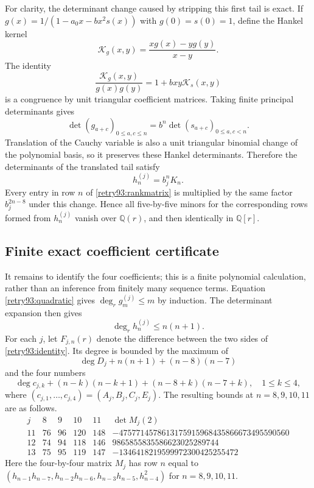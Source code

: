 \documentclass[11pt,a4paper]{article}
\theoremstyle{definition}
\theoremstyle{remark}
\begin{document}
For clarity, the determinant change caused by stripping this first tail
is exact. If $g(x)=1/(1-a_0x-bx^2s(x))$ with $g(0)=s(0)=1$, define the
Hankel kernel
\[
 \mathcal K_g(x,y)=\frac{xg(x)-yg(y)}{x-y}.
\]
The identity
\[
 \frac{\mathcal K_g(x,y)}{g(x)g(y)}=1+bxy\mathcal K_s(x,y)
\]
is a congruence by unit triangular coefficient matrices. Taking finite
principal determinants gives
\[
 \det(g_{a+c})_{0\le a,c\le n}
 =b^n\det(s_{a+c})_{0\le a,c<n}.
\]
Translation of the Cauchy variable is also a unit triangular binomial
change of the polynomial basis, so it preserves these Hankel determinants.
Therefore the determinants of the translated tail satisfy
\begin{equation}\label{retry93:gauge}
 h_n^{(j)}=b_j^nK_n.
\end{equation}
Every entry in row $n$ of \eqref{retry93:rankmatrix} is multiplied by the
same factor $b_j^{2n-8}$ under this change. Hence all five-by-five minors
for the corresponding rows formed from $h_n^{(j)}$ vanish over
$\mathbb Q(r)$, and then identically in $\mathbb Q[r]$.

\subsection{Finite exact coefficient certificate}
It remains to identify the four coefficients; this is a finite polynomial
calculation, rather than an inference from finitely many sequence terms.
Equation \eqref{retry93:quadratic} gives $\deg_r g_m^{(j)}\le m$ by induction.
The determinant expansion then gives
\[
 \deg_r h_n^{(j)}\le n(n+1).
\]
For each $j$, let $F_{j,n}(r)$ denote the difference between the two sides
of \eqref{retry93:identity}. Its degree is bounded by the maximum of
\[
 \deg D_j+n(n+1)+(n-8)(n-7)
\]
and the four numbers
\[
 \deg c_{j,k}+(n-k)(n-k+1)+(n-8+k)(n-7+k),\quad1\le k\le4,
\]
where $(c_{j,1},\ldots,c_{j,4})=(A_j,B_j,C_j,E_j)$.
The resulting bounds at $n=8,9,10,11$ are as follows.
\[
\begin{array}{c|rrrr|r}
j&8&9&10&11&\det M_j(2)\\\hline
11&76&96&120&148&-4757714578613175915968435866673495590560\\
12&74&94&118&146&9865855835586623025289744\\
13&75&95&119&147&-1346418219599972300425255472
\end{array}
\]
Here the four-by-four matrix $M_j$ has row $n$ equal to
$(h_{n-1}h_{n-7},h_{n-2}h_{n-6},h_{n-3}h_{n-5},h_{n-4}^2)$ for
$n=8,9,10,11$.
\end{document}
